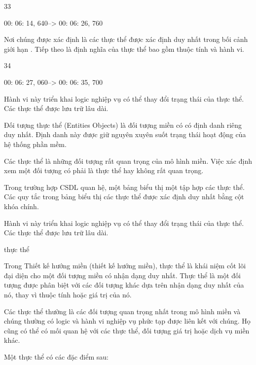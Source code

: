 33

00: 06: 14, 640--> 00: 06: 26, 760

Nơi chúng được xác định là các thực thể được xác định duy nhất trong bối cảnh giới hạn . Tiếp theo là định nghĩa của thực thể bao gồm thuộc tính và hành vi.

34

00: 06: 27, 060--> 00: 06: 35, 700

Hành vi này triển khai logic nghiệp vụ có thể thay đổi trạng thái của thực thể. Các thực thể được lưu trữ lâu dài.





Đối tượng thực thể (Entities Objects)  là đối tượng miền có có định danh riêng  duy nhất.  Định danh này được giữ nguyên xuyên suốt trạng thái hoạt động của hệ thống phần mềm.


Các thực thể là những đối tượng rất quan trọng của mô hình miền. Việc xác định xem một đối tượng có phải là thực thể hay không rất quan trọng.

Trong trường hợp CSDL quan hệ, một bảng biểu thị một tập hợp các thực thể. Các quy tắc trong bảng biểu thị các thực thể được xác định duy nhất bằng cột khóa chính.

Hành vi này triển khai logic nghiệp vụ có thể thay đổi trạng thái của thực thể. Các thực thể được lưu trữ lâu dài.






thực thể

Trong Thiết kế hướng miền (thiết kế hướng miền), thực thể là khái niệm cốt lõi đại diện cho một đối tượng miền có nhận dạng duy nhất. Thực thể là một đối tượng được phân biệt với các đối tượng khác dựa trên nhận dạng duy nhất của nó, thay vì thuộc tính hoặc giá trị của nó.

Các thực thể thường là các đối tượng quan trọng nhất trong mô hình miền và chúng thường có logic và hành vi nghiệp vụ phức tạp được liên kết với chúng. Họ cũng có thể có mối quan hệ với các thực thể, đối tượng giá trị hoặc dịch vụ miền khác.

Một thực thể có các đặc điểm sau:

